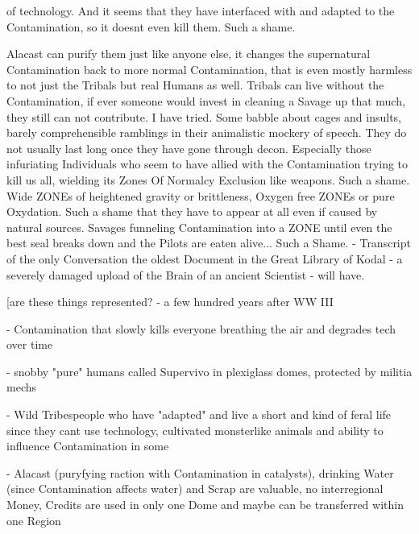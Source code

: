 \documentclass{article}
\begin{document}
    of technology. And it seems that they have interfaced with and adapted to the Contamination, so it doesnt even kill
    them. Such a shame. \par
    Alacast can purify them just like anyone else, it changes the supernatural Contamination back to more normal
    Contamination, that is even mostly harmless to not just the Tribals but real Humans as well. Tribals can live without
    the Contamination, if ever someone would invest in cleaning a Savage up that much, they still can not contribute.
    I have tried. Some babble about cages and insults, barely comprehensible ramblings in their animalistic mockery of
    speech. They do not usually last long once they have gone through decon. Especially those infuriating Individuals
    who seem to have allied with the Contamination trying to kill us all, wielding its Zones Of Normalcy Exclusion like
    weapons. Such a shame. Wide ZONEs of heightened gravity or brittleness, Oxygen free ZONEs or pure Oxydation. Such a
    shame that they have to appear at all even if caused by natural sources. Savages funneling Contamination into a ZONE
    until even the best seal breaks down and the Pilots are eaten alive... Such a Shame.\newline
    \newline
    - Transcript of the only Conversation the oldest Document in the Great Library of Kodal - a severely damaged
    upload of the Brain of an ancient Scientist - will have.\newpage

    [are these things represented?
    - a few hundred years after WW III\par

    - Contamination that slowly kills everyone breathing the air and degrades tech over time\par

    - snobby "pure" humans called Supervivo in plexiglass domes, protected by militia mechs\par

    - Wild Tribespeople who have "adapted" and live a short and kind of feral life since they cant use technology, cultivated monsterlike animals and ability to influence Contamination in some\par

    - Alacast (puryfying raction with Contamination in catalysts), drinking Water (since Contamination affects water) and Scrap are valuable, no interregional Money, Credits are used in only one Dome and maybe can be transferred within one Region\par
\end{document}

